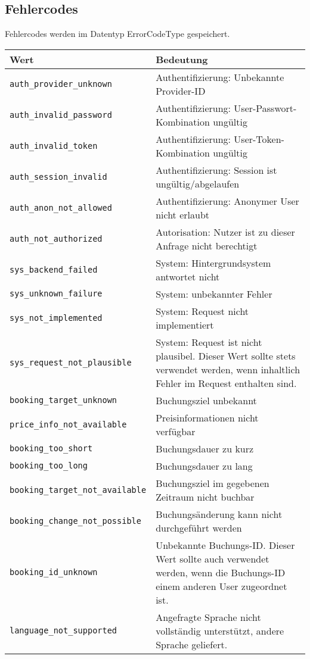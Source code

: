 \subsection*{Fehlercodes}
Fehlercodes werden im Datentyp ErrorCodeType gespeichert.
\begin{flushleft}
\begin{tabularx}{\linewidth}{l>{\raggedright\arraybackslash}X} 
\toprule
Wert & Bedeutung\\
\midrule
\texttt{auth\_provider\_unknown} & Authentifizierung: Unbekannte Provider-ID\\
\texttt{auth\_invalid\_password} & Authentifizierung: User-Passwort-Kombination ungültig\\
\texttt{auth\_invalid\_token} & Authentifizierung: User-Token-Kombination ungültig\\
\texttt{auth\_session\_invalid} & Authentifizierung: Session ist ungültig/abgelaufen\\
\texttt{auth\_anon\_not\_allowed} & Authentifizierung: Anonymer User nicht erlaubt\\
\texttt{auth\_not\_authorized} & Autorisation: Nutzer ist zu dieser Anfrage nicht berechtigt\\
\texttt{sys\_backend\_failed} & System: Hintergrundsystem antwortet nicht\\
\texttt{sys\_unknown\_failure} & System: unbekannter Fehler\\
\texttt{sys\_not\_implemented} & System: Request nicht implementiert\\
\texttt{sys\_request\_not\_plausible} & System: Request ist nicht plausibel. Dieser Wert sollte stets verwendet werden, wenn inhaltlich Fehler im Request enthalten sind.\\
\texttt{booking\_target\_unknown} & Buchungsziel unbekannt\\
\texttt{price\_info\_not\_available} & Preisinformationen nicht verfügbar\\
\texttt{booking\_too\_short} & Buchungsdauer zu kurz\\
\texttt{booking\_too\_long} & Buchungsdauer zu lang\\
\texttt{booking\_target\_not\_available} & Buchungsziel im gegebenen Zeitraum nicht buchbar\\
\texttt{booking\_change\_not\_possible} & Buchungsänderung kann nicht durchgeführt werden\\
\texttt{booking\_id\_unknown} & Unbekannte Buchungs-ID. Dieser Wert sollte auch verwendet werden, wenn die Buchungs-ID einem anderen User zugeordnet ist.\\
\texttt{language\_not\_supported} & Angefragte Sprache nicht vollständig unterstützt, andere Sprache geliefert.\\
\bottomrule
\end{tabularx}
\end{flushleft}